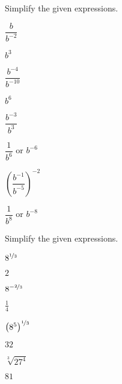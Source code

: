 \begin{essentialskills}
	\begin{problem} Simplify the given expressions.
	\begin{multicols}{4}
		\begin{subproblem}
			$\dfrac{b}{b^{-2}}$
			\begin{shortsolution}
				$b^{3}$
			\end{shortsolution}
		\end{subproblem}
		\begin{subproblem}
			$\dfrac{b^{-4}}{b^{-10}}$
			\begin{shortsolution}
				$b^6$
			\end{shortsolution}
		\end{subproblem}
		\begin{subproblem}
			$\dfrac{b^{-3}}{b^3}$
			\begin{shortsolution}
				$\dfrac{1}{b^6}$ or $b^{-6}$
			\end{shortsolution}
		\end{subproblem}
		\begin{subproblem}
			$\left(\dfrac{b^{-1}}{b^{-5}}\right)^{-2}$
			\begin{shortsolution}
				$\dfrac{1}{b^8}$ or $b^{-8}$
			\end{shortsolution}
		\end{subproblem}
	\end{multicols}
	\end{problem}
											
	\begin{problem} Simplify the given expressions.
	\begin{multicols}{4}
		\begin{subproblem}
			$8^{\nicefrac{1}3}$
			\begin{shortsolution}
				$2$
			\end{shortsolution}
		\end{subproblem}
		\begin{subproblem}
			$8^{-\nicefrac{2}3}$
			\begin{shortsolution}
				$\frac{1}{4}$
			\end{shortsolution}
		\end{subproblem}	
		\begin{subproblem}
			$\left(8^5\right)^{\nicefrac{1}{3}}$
			\begin{shortsolution}
				$32$
			\end{shortsolution}
		\end{subproblem}	
		\begin{subproblem}
			$\sqrt[3]{27^4}$
			\begin{shortsolution}
				$81$
			\end{shortsolution}
		\end{subproblem}	
	\end{multicols}
	\end{problem}
											

\end{essentialskills}
